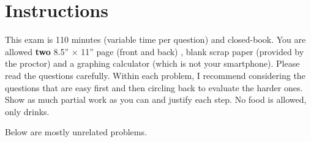 \documentclass[12pt]{article}
\begin{document}
\section*{Instructions}
This exam is 110 minutes (variable time per question) and closed-book. You are allowed \textbf{two} 8.5'' $\times$ 11'' page (front and back) , blank scrap paper (provided by the proctor) and a graphing calculator (which is not your smartphone). Please read the questions carefully. Within each problem, I recommend considering the questions that are easy first and then circling back to evaluate the harder ones. Show as much partial work as you can and justify each step. No food is allowed, only drinks. %

\pagebreak


\problem Below are mostly unrelated problems.
\end{document}
